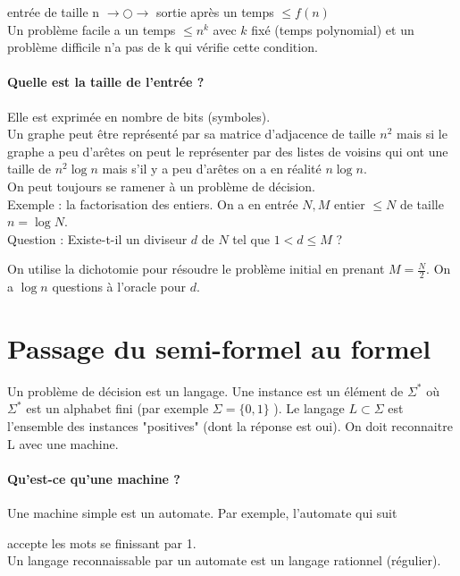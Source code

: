 \documentclass[12pt,a4paper]{report}
\begin{document}
entrée de taille n $\longrightarrow \bigcirc \longrightarrow $ sortie après un temps $ \leqslant f(n) $ \\
Un problème facile a un temps $\leqslant n^k$ avec $ k$ fixé (temps polynomial) et un problème difficile n'a pas de k qui vérifie cette condition.\\

\paragraph{Quelle est la taille de l'entrée ?\\}
Elle est exprimée en nombre de bits (symboles). \\
Un graphe peut être représenté par sa matrice d'adjacence de taille $n^2$ mais si le graphe a peu d'arêtes on peut le représenter par des listes de voisins qui ont une taille de $n^2 \log n$ mais s'il y a peu d'arêtes on a en réalité $n\log n$.\\
On peut toujours se ramener à un problème de décision.\\

Exemple : la factorisation des entiers. On a en entrée $N, M$ entier $\leqslant N$ de taille $n=\log N$.\\
Question : Existe-t-il un diviseur $d$ de $N$ tel que $1 < d \leqslant M$ ?
\begin{figure}[h]
	\centering
  \scalebox{0.8}{}
\end{figure}

On utilise la dichotomie pour résoudre le problème initial en prenant $M = \frac{N}{2} $. On a $\log n$ questions à l'oracle pour $d$.

\section{Passage du semi-formel au formel}
Un problème de décision est un langage. Une instance est un élément de $\Sigma ^*$ où $\Sigma ^*$ est un alphabet fini (par exemple $ \Sigma = \{0,1\} $ ). Le langage $ L \subset \Sigma $ est l'ensemble des instances "positives" (dont la réponse est oui). On doit reconnaitre L avec une machine. 
\paragraph{Qu'est-ce qu'une machine ?\\}
Une machine simple est un automate. Par exemple, l'automate qui suit 
\begin{figure}[h]
	\centering
  \scalebox{0.5}{}
\end{figure}
 accepte les mots se finissant par 1.\\
Un langage reconnaissable par un automate est un langage rationnel (régulier).\\
\end{document}

